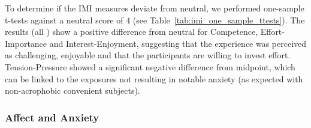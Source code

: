 To determine if the IMI measures deviate from neutral, we performed one-sample t-tests against a neutral score of $4$ (see Table~\ref{tab:imi_one_sample_ttests}). 
The results (all ) show a positive difference from neutral for Competence, Effort-Importance and Interest-Enjoyment, suggesting that the experience was perceived as challenging, enjoyable and that the participants are willing to invest effort.
Tension-Pressure showed a significant negative difference from midpoint, which can be linked to the exposures not resulting in notable anxiety (as expected with non-acrophobic convenient subjects).

\subsubsection*{Affect and Anxiety}









